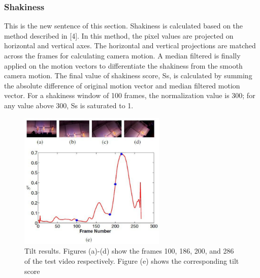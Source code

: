 \documentclass{sig-alternate}
\begin{document}
{{{\subsubsection{Shakiness}
This is the new sentence of this section.
Shakiness is calculated based on the method described in [4].
In this method, the pixel values are projected on horizontal and
vertical axes. The horizontal and vertical projections are matched
across the frames for calculating camera motion. A median filtered
is finally applied on the motion vectors to differentiate the shakiness
from the smooth camera motion. The final value of shakiness
score, Ss, is calculated by summing the absolute difference of original
motion vector and median filtered motion vector.  For a
shakiness window of 100 frames, the normalization value is 300;
for any value above 300, Ss is saturated to 1.

\begin{figure}
    \centering
    \includegraphics[width=70mm]{video_2.pdf}
    \caption{Tilt results. Figures (a)-(d) show the frames 100, 186,
200, and 286 of the test video respectively. Figure (e) shows the
corresponding tilt score}
    \label{fig:my_label}
\end{figure}


}}}
\end{document}
